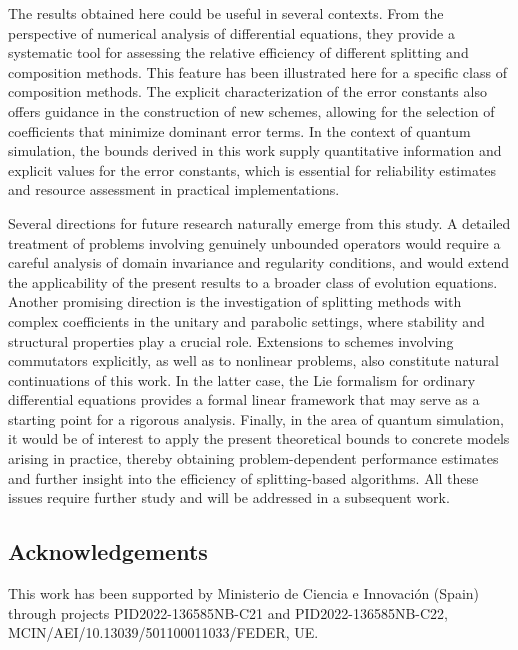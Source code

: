 \documentclass[11pt]{article}
\begin{document}
The results obtained here could be useful in several contexts. From the
perspective of numerical analysis of differential equations, they provide
a systematic tool for assessing the relative efficiency of different
splitting and composition methods. This feature has been illustrated here for a specific class of composition methods.
 The explicit characterization of the
error constants also offers guidance in the construction of new schemes,
allowing for the selection of coefficients that minimize dominant error
terms. In the context of quantum simulation, the bounds derived in this
work supply quantitative information and explicit values for the error
constants, which is essential for reliability estimates and resource
assessment in practical implementations.

Several directions for future research naturally emerge from this study.
A detailed treatment of problems involving genuinely unbounded operators
would require a careful analysis of domain invariance and regularity
conditions, and would extend the applicability of the present results to
a broader class of evolution equations. Another promising direction is
the investigation of splitting methods with complex coefficients in the
unitary and parabolic settings, where stability and structural properties
play a crucial role. Extensions to schemes involving commutators
explicitly, as well as to nonlinear problems, also constitute natural
continuations of this work. In the latter case, the Lie formalism for
ordinary differential equations provides a formal linear framework that
may serve as a starting point for a rigorous analysis. Finally, in the
area of quantum simulation, it would be of interest to apply the present
theoretical bounds to concrete models arising in practice, thereby
obtaining problem-dependent performance estimates and further insight
into the efficiency of splitting-based algorithms. All these issues require further study and will be addressed in a subsequent work.

\subsection*{Acknowledgements}
This work has been supported by 
Ministerio de Ciencia e Innovaci\'on (Spain) through projects  PID2022-136585NB-C21 and PID2022-136585NB-C22, \newline
MCIN/AEI/10.13039/501100011033/FEDER, UE. 
\end{document}
